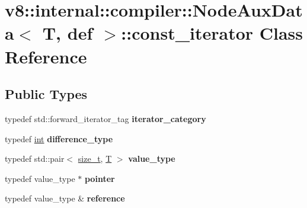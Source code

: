 \hypertarget{classv8_1_1internal_1_1compiler_1_1NodeAuxData_1_1const__iterator}{}\section{v8\+:\+:internal\+:\+:compiler\+:\+:Node\+Aux\+Data$<$ T, def $>$\+:\+:const\+\_\+iterator Class Reference}
\label{classv8_1_1internal_1_1compiler_1_1NodeAuxData_1_1const__iterator}
\subsection*{Public Types}
\begin{DoxyCompactItemize}
\item 
\mbox{\label{classv8_1_1internal_1_1compiler_1_1NodeAuxData_1_1const__iterator_a36a8b1a6b4a34cc4a4548c6196cbf1b2}} 
typedef std\+::forward\+\_\+iterator\+\_\+tag {\bfseries iterator\+\_\+category}
\item 
\mbox{\label{classv8_1_1internal_1_1compiler_1_1NodeAuxData_1_1const__iterator_a8a0402d5ed08af9450ff763c2894d21a}} 
typedef \mbox{\hyperlink{classint}{int}} {\bfseries difference\+\_\+type}
\item 
\mbox{\label{classv8_1_1internal_1_1compiler_1_1NodeAuxData_1_1const__iterator_ac103f15f868c9ee8d7cae4d2c621dbe8}} 
typedef std\+::pair$<$ \mbox{\hyperlink{classsize__t}{size\+\_\+t}}, \mbox{\hyperlink{classv8_1_1internal_1_1torque_1_1T}{T}} $>$ {\bfseries value\+\_\+type}
\item 
\mbox{\label{classv8_1_1internal_1_1compiler_1_1NodeAuxData_1_1const__iterator_abdb4ec32d6896c8e63a52061c68e12b6}} 
typedef value\+\_\+type $\ast$ {\bfseries pointer}
\item 
\mbox{\label{classv8_1_1internal_1_1compiler_1_1NodeAuxData_1_1const__iterator_a249c2a219394f149c139d20f51f92c41}} 
typedef value\+\_\+type \& {\bfseries reference}
\end{DoxyCompactItemize}
